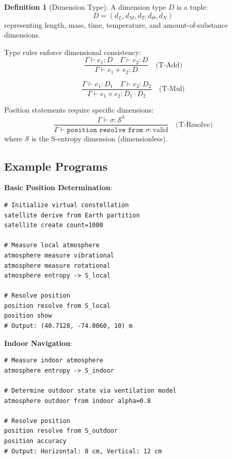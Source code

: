 \documentclass[twocolumn,10pt,a4paper]{article}
\theoremstyle{definition}
\newtheorem{definition}[theorem]{Definition}
\theoremstyle{remark}
\begin{document}
\begin{definition}[Dimension Type]
\label{def:dimension}
A dimension type $D$ is a tuple:
\begin{equation}
    D = (d_L, d_M, d_T, d_\Theta, d_N)
\end{equation}
representing length, mass, time, temperature, and amount-of-substance dimensions.
\end{definition}

Type rules enforce dimensional consistency:
\begin{equation}
    \frac{\Gamma \vdash e_1 : D \quad \Gamma \vdash e_2 : D}{\Gamma \vdash e_1 + e_2 : D} \quad \text{(T-Add)}
\end{equation}

\begin{equation}
    \frac{\Gamma \vdash e_1 : D_1 \quad \Gamma \vdash e_2 : D_2}{\Gamma \vdash e_1 \times e_2 : D_1 \cdot D_2} \quad \text{(T-Mul)}
\end{equation}

Position statements require specific dimensions:
\begin{equation}
    \frac{\Gamma \vdash \sigma : \mathcal{S}^3}{\Gamma \vdash \texttt{position resolve from } \sigma : \text{valid}} \quad \text{(T-Resolve)}
\end{equation}
where $\mathcal{S}$ is the S-entropy dimension (dimensionless).

\subsection{Example Programs}

\textbf{Basic Position Determination}:
\begin{lstlisting}
# Initialize virtual constellation
satellite derive from Earth partition
satellite create count=1000

# Measure local atmosphere
atmosphere measure vibrational
atmosphere measure rotational
atmosphere entropy -> S_local

# Resolve position
position resolve from S_local
position show
# Output: (40.7128, -74.0060, 10) m
\end{lstlisting}

\textbf{Indoor Navigation}:
\begin{lstlisting}
# Measure indoor atmosphere
atmosphere entropy -> S_indoor

# Determine outdoor state via ventilation model
atmosphere outdoor from indoor alpha=0.8

# Resolve position
position resolve from S_outdoor
position accuracy
# Output: Horizontal: 8 cm, Vertical: 12 cm
\end{lstlisting}
\end{document}
